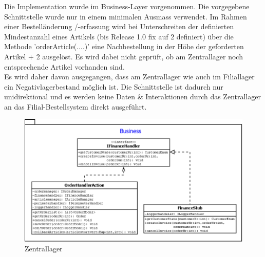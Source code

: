 Die Implementation wurde im Business-Layer vorgenommen. Die vorgegebene Schnittstelle wurde nur in einem minimalen Ausmass verwendet. Im Rahmen einer Bestelländerung /-erfassung wird bei Unterschreiten der definierten Mindestanzahl eines Artikels (bis Release 1.0 fix auf 2 definiert) über die Methode 'orderArticle(....)' eine Nachbestellung in der Höhe der geforderten Artikel + 2 ausgelöst. Es wird dabei nicht geprüft, ob am Zentrallager noch entsprechende Artikel vorhanden sind. \\Es wird daher davon ausgegangen, dass am Zentrallager wie auch im Filiallager ein Negativlagerbestand möglich ist. Die Schnittstelle ist dadurch nur unidirektional und es werden keine Daten \& Interaktionen durch das Zentrallager an das Filial-Bestellsystem direkt ausgeführt.  \\
\begin{figure}[H]
\centering
	\includegraphics[width=1.0\linewidth]{Images/Zentrallager}
	\caption{Zentrallager}
	\label{fig:zentrallager}
\end{figure}



